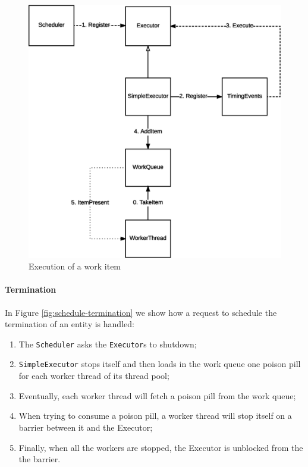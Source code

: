 \begin{figure}[H]
\centering
\includegraphics[scale=0.5,keepaspectratio]{images/solution/app/backend/scheduling-execution.eps}
\caption{Execution of a work item}
\label{fig:schedule-execution}
\end{figure}

\paragraph{Termination}

In Figure \ref{fig:schedule-termination} we show how a request to schedule
the termination of an entity is handled:

\begin{enumerate}
  \item The \texttt{Scheduler} asks the \texttt{Executor}s to shutdown;
  \item \texttt{SimpleExecutor} stops itself and then loads in the work queue
    one poison pill for each worker thread of its thread pool;
  \item Eventually, each worker thread will fetch a poison pill from the work
    queue;
  \item When trying to consume a poison pill, a worker thread will stop
    itself on a barrier between it and the Executor;
  \item Finally, when all the workers are stopped, the Executor is unblocked
    from the the barrier.
\end{enumerate}

